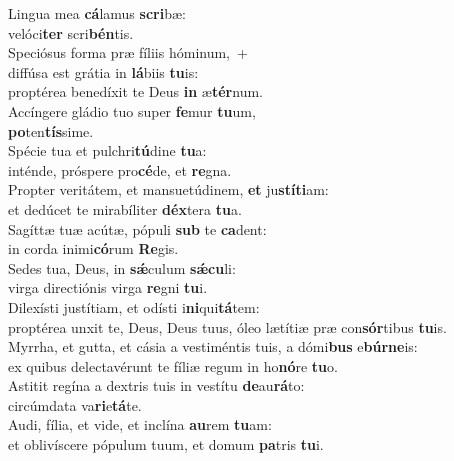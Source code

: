 \evenverse Lingua mea \textbf{cá}lamus \textbf{scri}bæ:~\*\\
\evenverse velóci\textbf{ter} scri\textbf{bén}tis.\\
\oddverse Speciósus forma præ fíliis hóminum,~+\\
\oddverse  diffúsa est grátia in \textbf{lá}biis \textbf{tu}is:~\*\\
\oddverse proptérea benedíxit te Deus \textbf{in} æ\textbf{tér}num.\\
\evenverse Accíngere gládio tuo super \textbf{fe}mur \textbf{tu}um,~\*\\
\evenverse \textbf{po}ten\textbf{tís}sime.\\
\oddverse Spécie tua et pulchri\textbf{tú}dine \textbf{tu}a:~\*\\
\oddverse inténde, próspere pro\textbf{cé}de, et \textbf{re}gna.\\
\evenverse Propter veritátem, et mansuetúdinem, \textbf{et} ju\textbf{stí}\textbf{ti}am:~\*\\
\evenverse et dedúcet te mirabíliter \textbf{déx}tera \textbf{tu}a.\\
\oddverse Sagíttæ tuæ acútæ, pópuli \textbf{sub} te \textbf{ca}dent:~\*\\
\oddverse in corda inimi\textbf{có}rum \textbf{Re}gis.\\
\evenverse Sedes tua, Deus, in \textbf{sǽ}culum \textbf{sǽ}\textbf{cu}li:~\*\\
\evenverse virga directiónis virga \textbf{re}gni \textbf{tu}i.\\
\oddverse Dilexísti justítiam, et odísti i\textbf{ni}qui\textbf{tá}tem:~\*\\
\oddverse proptérea unxit te, Deus, Deus tuus, óleo lætítiæ præ con\textbf{sór}tibus \textbf{tu}is.\\
\evenverse Myrrha, et gutta, et cásia a vestiméntis tuis, a dómi\textbf{bus} e\textbf{búr}\textbf{ne}is:~\*\\
\evenverse ex quibus delectavérunt te fíliæ regum in ho\textbf{nó}re \textbf{tu}o.\\
\oddverse Astitit regína a dextris tuis in vestítu \textbf{de}au\textbf{rá}to:~\*\\
\oddverse circúmdata va\textbf{ri}e\textbf{tá}te.\\
\evenverse Audi, fília, et vide, et inclína \textbf{au}rem \textbf{tu}am:~\*\\
\evenverse et oblivíscere pópulum tuum, et domum \textbf{pa}tris \textbf{tu}i.\\
